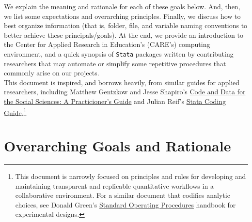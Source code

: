 We explain the meaning and rationale for each of these goals below. And, then, we list some expectations and overarching principles. Finally, we discuss how to best organize information (that is, folder, file, and variable naming conventions to better achieve these principals/goals). At the end, we provide an introduction to the Center for Applied Research in Education's (CARE's) computing environment, and a quick synopsis of \texttt{Stata} packages written by contributing researchers that may automate or simplify some repetitive procedures that commonly arise on our projects.\\

This document is inspired, and borrows heavily, from similar guides for applied researchers, including Matthew Gentzkow and Jesse Shapiro's \href{https://www.brown.edu/Research/Shapiro/pdfs/CodeAndData.pdf}{Code and Data for the Social Sciences: A Practicioner's Guide} and Julian Reif's \href{https://julianreif.com/guide/}{Stata Coding Guide}.\footnote{This document is narrowly focused on principles and rules for developing and maintaining transparent and replicable quantitative workflows in a collaborative environment. For a similar document that codifies analytic choices, see Donald Green's \href{https://alexandercoppock.com/Green-Lab-SOP/Green_Lab_SOP.html}{Standard Operating Procedures} handbook for experimental designs.}

\section{Overarching Goals and Rationale} \label{sec:rationale}

